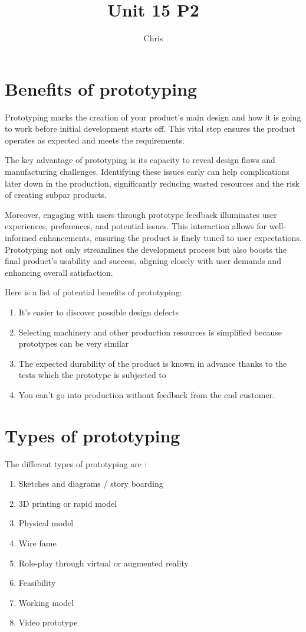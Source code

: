 \documentclass{article}
\title{Unit 15 P2}
\author{Chris}
\date{}
\begin{document}
\maketitle
\tableofcontents
\break
 

\section{Benefits of prototyping}
Prototyping marks the creation of your product's main design and how it is going to work before initial development starts off. This vital step ensures the product operates as expected and meets the requirements.


The key advantage of prototyping is its capacity to reveal design flaws and manufacturing challenges. Identifying these issues early can help complications later down in the production, significantly reducing wasted resources and the risk of creating subpar products.


Moreover, engaging with users through prototype feedback illuminates user experiences, preferences, and potential issues. This interaction allows for well-informed enhancements, ensuring the product is finely tuned to user expectations. Prototyping not only streamlines the development process but also boosts the final product's usability and success, aligning closely with user demands and enhancing overall satisfaction.


Here is a list of potential benefits of prototyping:
\begin{enumerate}
    \item It's easier to discover possible design defects
    \item Selecting machinery and other production resources is simplified because prototypes can be very similar
    \item The expected durability of the product is known in advance thanks to the tests which the prototype is subjected to
    \item You can't go into production without feedback from the end customer. 
\end{enumerate}

\section{Types of prototyping}
The different types of prototyping are :
\begin{enumerate}
    \item Sketches and diagrams / story boarding
    \item 3D printing or rapid model
    \item Physical model
    \item Wire fame
    \item Role-play through virtual or augmented reality
    \item Feasibility
    \item Working model
    \item Video prototype
\end{enumerate}
\end{document}
